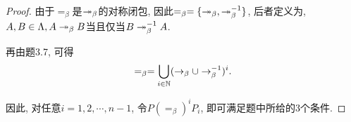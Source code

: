 \begin{proof}由于$=_\beta$是$\twoheadrightarrow_{\beta}$的对称闭包, 因此$=_\beta=\{\twoheadrightarrow_{\beta}, \twoheadrightarrow_{\beta}^{-1}\}$, 后者定义为, $A,B\in\Lambda, A\twoheadrightarrow_{\beta} B$当且仅当$B\twoheadrightarrow_{\beta}^{-1}A$.
	
	再由题3.7, 可得
	$$=_\beta=\bigcup_{i\in\mathbb{N}}(\rightarrow_{\beta}\cup\rightarrow_{\beta}^{-1})^i.$$
	
	因此, 对任意$i=1,2,\cdots, n-1$, 令$P(=_\beta)^iP_i$, 即可满足题中所给的3个条件.
\end{proof}